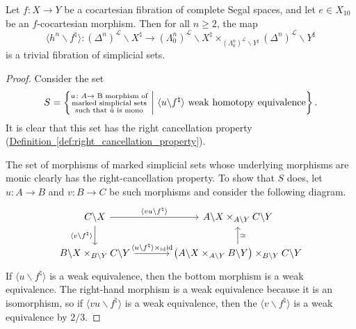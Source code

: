 \documentclass[main.tex]{subfiles}
\begin{document}
\begin{proposition}
  \label{prop:segal_cocartesian_morphisms_are_quasicategory_cocartesian}
  Let $f\colon X \to Y$ be a cocartesian fibration of complete Segal spaces, and let $e \in X_{10}$ be an $f$-cocartesian morphism. Then for all $n \geq 2$, the map
  \begin{equation*}
    \langle h^{n} \backslash f^{\natural} \rangle\colon (\Delta^{n})^{\mathcal{L}} \backslash X^{\natural} \to (\Lambda^{n}_{0})^{\mathcal{L}} \backslash X^{\natural} \times_{(\Lambda^{n}_{0})^{\mathcal{L}} \backslash Y^{\sharp}} (\Delta^{n})^{\mathcal{L}} \backslash Y^{\sharp}
  \end{equation*}
  is a trivial fibration of simplicial sets.
\end{proposition}
\begin{proof}
  Consider the set
  \begin{equation*}
    S =
    \left\{
      \substack{
        u\colon A \to \text{ B morphism of} \\
        \text{marked simplicial sets} \\
        \text{such that $\mathring{u}$ is mono}
      }
      \ \bigg| \
      \langle u \backslash f^{\natural} \rangle \text{ weak homotopy equivalence}
    \right\}.
  \end{equation*}
  It is clear that this set has the right cancellation property (\hyperref[def:right_cancellation_property]{Definition~\ref*{def:right_cancellation_property}}).

  The set of morphisms of marked simplicial sets whose underlying morphisms are monic clearly has the right-cancellation property. To show that $S$ does, let $u\colon A \to B$ and $v\colon B \to C$ be such morphisms and consider the following diagram.
  \begin{equation*}
    \begin{tikzcd}[column sep=large]
      C \backslash X
      \arrow[r, "\langle vu \backslash f^{\natural} \rangle"]
      \arrow[d, swap, "\langle v \backslash f^{\natural} \rangle"]
      & A \backslash X \times_{A \backslash Y} C \backslash Y
      \\
      B \backslash X \times_{B \backslash Y} C \backslash Y  
      \arrow[r, "\langle u \backslash f^{\natural} \rangle \times_{\id} \id"]
      & \left( A \backslash X \times_{A \backslash Y} B \backslash Y \right) \times_{B \backslash Y} C \backslash Y
      \arrow[u, swap, "\simeq"]
    \end{tikzcd}
  \end{equation*}
  If $\langle u \backslash f^{\natural} \rangle$ is a weak equivalence, then the bottom morphism is a weak equivalence. The right-hand morphism is a weak equivalence because it is an isomorphism, so if $\langle vu \backslash f^{\natural} \rangle$ is a weak equivalence, then the $\langle v \backslash f^{\natural} \rangle$ is a weak equivalence by $2 / 3$.


\end{proof}
\end{document}
